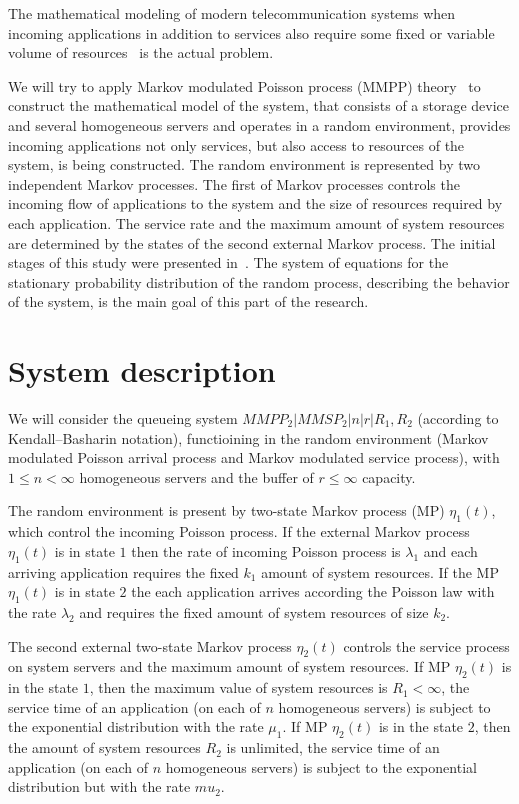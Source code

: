 {The mathematical modeling of modern telecommunication systems when
incoming applications in addition to services also require some fixed
or variable volume of
resources~\cite{sop1,sop3,sop4,sop5,sop6,sop7,sop8} is the actual
problem.

We will try to apply Markov modulated Poisson process (MMPP)
theory~\cite{Neuts3,Neuts4,Neuts5,Neuts6,4} to construct the
mathematical model of the system, that consists of a storage device
and several homogeneous servers and operates in a random environment,
provides incoming applications not only services, but also access to
resources of the system, is being constructed. The random environment
is represented by two independent Markov processes. The first of
Markov processes controls the incoming flow of applications to the
system and the size of resources required by each application. The
service rate and the maximum amount of system resources are determined
by the states of the second external Markov process.  The initial
stages of this study were presented in~\cite{13}. The system of
equations for the stationary probability distribution of the random
process, describing the behavior of the system, is the main goal of
this part of the research.



\section{System description} 
\label{sec:base-section}

We will consider the queueing system $MMPP_2 |MMSP_2 |n|r|R_1,R_2$
(according to Kendall--Basharin notation\cite{Boch}), functioining in
the random environment (Markov modulated Poisson arrival process and
Markov modulated service process), with $1\leqslant  n<\infty$ homogeneous
servers and the buffer of $r\leqslant  \infty$ capacity.


The random environment is present by two-state Markov process (MP)
$\eta_1 (t)$, which control the incoming Poisson process.  If the
external Markov process $\eta_1 (t)$ is in state $1$ then the rate of
incoming Poisson process is $\lambda_1$ and each arriving application
requires the fixed $k_1$ amount of system resources. If the MP
$\eta_1 (t)$ is in state $2$ the each application arrives according
the Poisson law with the rate $\lambda_2$ and requires the fixed
amount of system resources of size $k_2$.

The second external two-state Markov process $\eta_2 (t)$ controls the
service process on system servers and the maximum amount of system
resources. If MP $\eta_2 (t)$ is in the state $1$, then the maximum
value of system resources is $R_1<\infty$, the service time of an
application (on each of $n$ homogeneous servers) is subject to the
exponential distribution with the rate $\mu_1$. If MP $\eta_2 (t)$ is
in the state $2$, then the amount of system resources $R_2$ is
unlimited, the service time of an application (on each of $n$
homogeneous servers) is subject to the exponential distribution but
with the rate $mu_2$.

}
